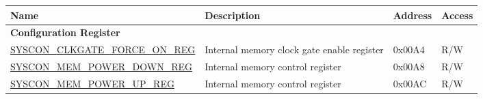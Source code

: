 \begin{longtable}{ | p{6.5cm} | p{6.5cm} | p{1.3cm} | p{1cm} |}
\hline\rowcolor{lightgray}
\textbf{Name} & \textbf{Description} &  \textbf{Address} & \textbf{Access} \\ \hline
\endhead
\multicolumn{4}{|l|}{\textbf{Configuration Register}} \\ \hline
\hyperref[regdesc:SYSCONCLKGATEFORCEONREG]{SYSCON\_CLKGATE\_FORCE\_ON\_REG} & Internal memory clock gate enable register & 0x00A4 & R/W \\ \hline
\hyperref[regdesc:SYSCONMEMPOWERDOWNREG]{SYSCON\_MEM\_POWER\_DOWN\_REG} & Internal memory control register & 0x00A8 & R/W \\ \hline
\hyperref[regdesc:SYSCONMEMPOWERUPREG]{SYSCON\_MEM\_POWER\_UP\_REG} & Internal memory control register & 0x00AC & R/W \\ \hline
\end{longtable}
